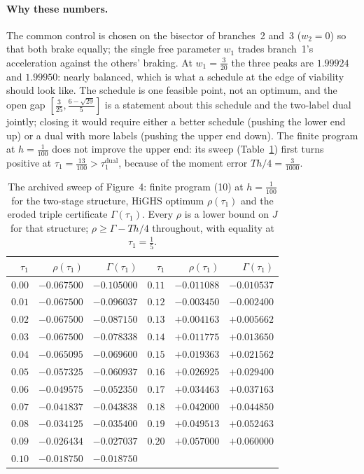 \documentclass[11pt,a4paper]{article}
\theoremstyle{plain}
\theoremstyle{definition}
\theoremstyle{remark}
\newcommand{\tfr}[2]{\tfrac{#1}{#2}}
\begin{document}
\paragraph{Why these numbers.}
The common control is chosen on the bisector of branches~2 and~3 ($w_2=0$) so that both brake equally; the single free parameter $w_1$ trades branch~1's acceleration against the others' braking. At $w_1=\tfr3{20}$ the three peaks are $1.99924$ and $1.99950$: nearly balanced, which is what a schedule at the edge of viability should look like. The schedule is one feasible point, not an optimum, and the open gap $[\tfr3{25},\tfr{6-\sqrt{29}}5]$ is a statement about this schedule and the two-label dual jointly; closing it would require either a better schedule (pushing the lower end up) or a dual with more labels (pushing the upper end down). The finite program at $h=\tfr1{100}$ does not improve the upper end: its sweep (Table~\ref{tab:sweep}) first turns positive at $\tau_1=\tfr{13}{100}>\tau_1^{\mathrm{dual}}$, because of the moment error $Th/4=\tfr3{1000}$.

\begin{table}[h]
\centering\footnotesize
\caption{The archived sweep of Figure~4: finite program (10) at $h=\tfr1{100}$ for the two-stage structure, HiGHS optimum $\rho(\tau_1)$ and the eroded triple certificate $\Gamma(\tau_1)$. Every $\rho$ is a lower bound on $J$ for that structure; $\rho\ge\Gamma-Th/4$ throughout, with equality at $\tau_1=\tfr15$.}
\label{tab:sweep}
\begin{tabular}{@{}rrr@{\qquad}rrr@{}}
\toprule
$\tau_1$ & $\rho(\tau_1)$ & $\Gamma(\tau_1)$ & $\tau_1$ & $\rho(\tau_1)$ & $\Gamma(\tau_1)$\\
\midrule
$0.00$ & $-0.067500$ & $-0.105000$ & $0.11$ & $-0.011088$ & $-0.010537$\\
$0.01$ & $-0.067500$ & $-0.096037$ & $0.12$ & $-0.003450$ & $-0.002400$\\
$0.02$ & $-0.067500$ & $-0.087150$ & $0.13$ & $+0.004163$ & $+0.005662$\\
$0.03$ & $-0.067500$ & $-0.078338$ & $0.14$ & $+0.011775$ & $+0.013650$\\
$0.04$ & $-0.065095$ & $-0.069600$ & $0.15$ & $+0.019363$ & $+0.021562$\\
$0.05$ & $-0.057325$ & $-0.060937$ & $0.16$ & $+0.026925$ & $+0.029400$\\
$0.06$ & $-0.049575$ & $-0.052350$ & $0.17$ & $+0.034463$ & $+0.037163$\\
$0.07$ & $-0.041837$ & $-0.043838$ & $0.18$ & $+0.042000$ & $+0.044850$\\
$0.08$ & $-0.034125$ & $-0.035400$ & $0.19$ & $+0.049513$ & $+0.052463$\\
$0.09$ & $-0.026434$ & $-0.027037$ & $0.20$ & $+0.057000$ & $+0.060000$\\
$0.10$ & $-0.018750$ & $-0.018750$ & & &\\
\bottomrule
\end{tabular}
\end{table}
\end{document}
